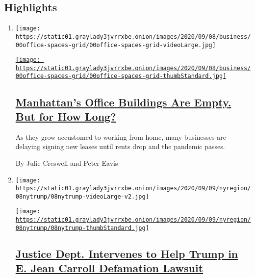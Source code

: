 \hypertarget{highlights}{%
\subsection{Highlights}\label{highlights}}

\begin{enumerate}
\def\labelenumi{\arabic{enumi}.}
\item
  \texttt{[image: https://static01.graylady3jvrrxbe.onion/images/2020/09/08/business/00office-spaces-grid/00office-spaces-grid-videoLarge.jpg]}

  \href{/2020/09/08/business/economy/new-york-office-space-coronavirus.html}{\texttt{[image: https://static01.graylady3jvrrxbe.onion/images/2020/09/08/business/00office-spaces-grid/00office-spaces-grid-thumbStandard.jpg]}}

  \hypertarget{manhattans-office-buildings-are-empty-but-for-how-long}{%
  \subsection{\texorpdfstring{\href{/2020/09/08/business/economy/new-york-office-space-coronavirus.html}{Manhattan's
  Office Buildings Are Empty. But for How
  Long?}}{Manhattan's Office Buildings Are Empty. But for How Long?}}\label{manhattans-office-buildings-are-empty-but-for-how-long}}

  As they grow accustomed to working from home, many businesses are
  delaying signing new leases until rents drop and the pandemic passes.

  By Julie Creswell and Peter Eavis
\item
  \texttt{[image: https://static01.graylady3jvrrxbe.onion/images/2020/09/09/nyregion/08nytrump/08nytrump-videoLarge-v2.jpg]}

  \href{/2020/09/08/nyregion/donald-trump-jean-carroll-lawsuit-rape.html}{\texttt{[image: https://static01.graylady3jvrrxbe.onion/images/2020/09/09/nyregion/08nytrump/08nytrump-thumbStandard.jpg]}}

  \hypertarget{justice-dept-intervenes-to-help-trump-in-e-jean-carroll-defamation-lawsuit}{%
  \subsection{\texorpdfstring{\href{/2020/09/08/nyregion/donald-trump-jean-carroll-lawsuit-rape.html}{Justice
  Dept. Intervenes to Help Trump in E. Jean Carroll Defamation
  Lawsuit}}{Justice Dept. Intervenes to Help Trump in E. Jean Carroll Defamation Lawsuit}}\label{justice-dept-intervenes-to-help-trump-in-e-jean-carroll-defamation-lawsuit}}


\end{enumerate}
